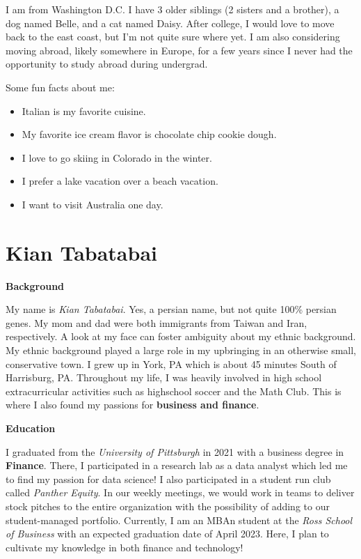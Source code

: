 \documentclass[
]{book}
\providecommand{\tightlist}{%
  \setlength{\itemsep}{0pt}\setlength{\parskip}{0pt}}
\begin{document}
I am from Washington D.C. I have 3 older siblings (2 sisters and a brother), a dog named Belle, and a cat named Daisy. After college, I would love to move back to the east coast, but I'm not quite sure where yet. I am also considering moving abroad, likely somewhere in Europe, for a few years since I never had the opportunity to study abroad during undergrad.

Some fun facts about me:

\begin{itemize}
\tightlist
\item
  Italian is my favorite cuisine.
\item
  My favorite ice cream flavor is chocolate chip cookie dough.
\item
  I love to go skiing in Colorado in the winter.
\item
  I prefer a lake vacation over a beach vacation.
\item
  I want to visit Australia one day.
\end{itemize}

\hypertarget{kian-tabatabai}{%
\section{Kian Tabatabai}\label{kian-tabatabai}}

\textbf{Background}

My name is \emph{Kian Tabatabai}. Yes, a persian name, but not quite 100\% persian genes. My mom and dad were both immigrants from Taiwan and Iran, respectively. A look at my face can foster ambiguity about my ethnic background. My ethnic background played a large role in my upbringing in an otherwise small, conservative town. I grew up in York, PA which is about 45 minutes South of Harrisburg, PA. Throughout my life, I was heavily involved in high school extracurricular activities such as highschool soccer and the Math Club. This is where I also found my passions for \textbf{business and finance}.

\textbf{Education}

I graduated from the \emph{University of Pittsburgh} in 2021 with a business degree in \textbf{Finance}. There, I participated in a research lab as a data analyst which led me to find my passion for data science! I also participated in a student run club called \emph{Panther Equity}. In our weekly meetings, we would work in teams to deliver stock pitches to the entire organization with the possibility of adding to our student-managed portfolio. Currently, I am an MBAn student at the \emph{Ross School of Business} with an expected graduation date of April 2023. Here, I plan to cultivate my knowledge in both finance and technology!
\end{document}
